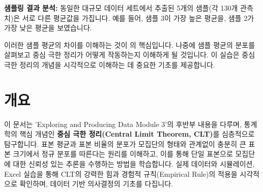 \documentclass[11pt,a4paper]{article}
\theoremstyle{definition}
\begin{document}
\begin{tcolorbox}[summarybox]
\textbf{샘플링 결과 분석:}
동일한 대규모 데이터 세트에서 추출된 5개의 샘플(각 130개 관측치)은 서로 다른 평균값을 가집니다. 예를 들어, 샘플 3이 가장 높은 평균을, 샘플 2가 가장 낮은 평균을 보였습니다.

이러한 샘플 평균의 차이를 이해하는 것이 의 핵심입니다. 나중에 샘플 평균의 분포를 살펴보고 중심 극한 정리가 어떻게 작동하는지 이해하게 될 것입니다. 이 실습은 중심 극한 정리의 개념을 시각적으로 이해하는 데 중요한 기초를 제공합니다.
\end{tcolorbox}

\newpage

\section{개요}
\begin{summarybox}[문서 핵심 요약]
이 문서는 'Exploring and Producing Data Module 3'의 후반부 내용을 다루며,
통계학의 핵심 개념인 \textbf{중심 극한 정리(Central Limit Theorem, CLT)}를 심층적으로 탐구합니다.
표본 평균과 표본 비율의 분포가 모집단의 형태와 관계없이 충분히 큰 표본 크기에서 정규 분포를 따른다는 원리를 이해하고,
이를 통해 단일 표본으로 모집단에 대한 신뢰성 있는 추론을 수행하는 방법을 학습합니다.
실제 데이터와 시뮬레이션, Excel 실습을 통해 CLT의 강력한 힘과 경험적 규칙(Empirical Rule)의 적용을 시각적으로 확인하며,
데이터 기반 의사결정의 기초를 다집니다.
\end{summarybox}

\newpage
\end{document}
